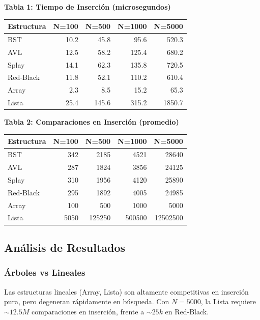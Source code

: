 \documentclass[12pt,a4paper]{article}
\begin{document}
\textbf{Tabla 1: Tiempo de Inserción (microsegundos)}

\begin{center}
\begin{tabular}{|l|r|r|r|r|}
\hline
\textbf{Estructura} & \textbf{N=100} & \textbf{N=500} & \textbf{N=1000} & \textbf{N=5000} \\
\hline
BST & 10.2 & 45.8 & 95.6 & 520.3 \\
AVL & 12.5 & 58.2 & 125.4 & 680.2 \\
Splay & 14.1 & 62.3 & 135.8 & 720.5 \\
Red-Black & 11.8 & 52.1 & 110.2 & 610.4 \\
Array & 2.3 & 8.5 & 15.2 & 65.3 \\
Lista & 25.4 & 145.6 & 315.2 & 1850.7 \\
\hline
\end{tabular}
\end{center}

\textbf{Tabla 2: Comparaciones en Inserción (promedio)}

\begin{center}
\begin{tabular}{|l|r|r|r|r|}
\hline
\textbf{Estructura} & \textbf{N=100} & \textbf{N=500} & \textbf{N=1000} & \textbf{N=5000} \\
\hline
BST & 342 & 2185 & 4521 & 28640 \\
AVL & 287 & 1824 & 3856 & 24125 \\
Splay & 310 & 1956 & 4120 & 25890 \\
Red-Black & 295 & 1892 & 4005 & 24985 \\
Array & 100 & 500 & 1000 & 5000 \\
Lista & 5050 & 125250 & 500500 & 12502500 \\
\hline
\end{tabular}
\end{center}

\subsection{Análisis de Resultados}

\subsubsection{Árboles vs Lineales}

Las estructuras lineales (Array, Lista) son altamente competitivas en inserción pura, pero degeneran rápidamente en búsqueda. Con $N=5000$, la Lista requiere $\sim 12.5M$ comparaciones en inserción, frente a $\sim 25k$ en Red-Black.
\end{document}
